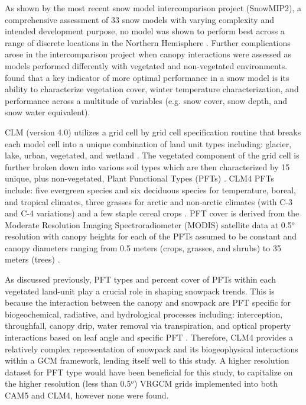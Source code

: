 \documentclass[11pt]{article}
\begin{document}
As shown by the most recent snow model intercomparison project (SnowMIP2), a comprehensive assessment of 33 snow models with varying complexity and intended development purpose, no model was shown to perform best across a range of discrete locations in the Northern Hemisphere \citep{rutter2009SnowMIP2}.  Further complications arose in the intercomparison project when canopy interactions were assessed as models performed differently with vegetated and non-vegetated environments.  \citet{rutter2009SnowMIP2} found that a key indicator of more optimal performance in a snow model is its ability to characterize vegetation cover, winter temperature characterization, and performance across a multitude of variables (e.g. snow cover, snow depth, and snow water equivalent).
    
CLM (version 4.0) utilizes a grid cell by grid cell specification routine that breaks each model cell into a unique combination of land unit types including: glacier, lake, urban, vegetated, and wetland \citep{lawrence2011parameterization}.  The vegetated component of the grid cell is further broken down into various soil types which are then characterized by 15 unique, plus non-vegetated, Plant Functional Types (PFTs) \citep{lawrence2011parameterization}. CLM4 PFTs include: five evergreen species and six deciduous species for temperature, boreal, and tropical climates, three grasses for arctic and non-arctic climates (with C-3 and C-4 variations) and a few staple cereal crops \citep{lawrence2011parameterization}.  PFT cover is derived from the Moderate Resolution Imaging Spectroradiometer (MODIS) satellite data at 0.5$^{o}$ resolution with canopy heights for each of the PFTs assumed to be constant and canopy diameters ranging from 0.5 meters (crops, grasses, and shrubs) to 35 meters (trees) \citep{lawrence2011parameterization}.  

As discussed previously, PFT types and percent cover of PFTs within each vegetated land-unit play a crucial role in shaping snowpack trends. This is because the interaction between the canopy and snowpack are PFT specific for biogeochemical, radiative, and hydrological processes including: interception, throughfall, canopy drip, water removal via transpiration, and optical property interactions based on leaf angle and specific PFT \citep{lawrence2011parameterization}.  Therefore, CLM4 provides a relatively complex representation of snowpack and its biogeophysical interactions within a GCM framework, lending itself well to this study.   A higher resolution dataset for PFT type would have been beneficial for this study, to capitalize on the higher resolution (less than 0.5$^{o}$) VRGCM grids implemented into both CAM5 and CLM4, however none were found.
\end{document}

